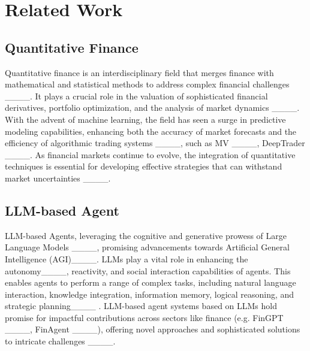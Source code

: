 \section{Related Work}
\subsection{Quantitative Finance}
Quantitative finance is an interdisciplinary field that merges finance with mathematical and statistical methods to address complex financial challenges ____. It plays a crucial role in the valuation of sophisticated financial derivatives, portfolio optimization, and the analysis of market dynamics ____. With the advent of machine learning, the field has seen a surge in predictive modeling capabilities, enhancing both the accuracy of market forecasts and the efficiency of algorithmic trading systems ____, such as MV ____, DeepTrader ____. As financial markets continue to evolve, the integration of quantitative techniques is essential for developing effective strategies that can withstand market uncertainties ____.

\subsection{LLM-based Agent}
LLM-based Agents, leveraging the cognitive and generative prowess of Large Language Models ____, promising advancements towards Artificial General Intelligence (AGI)____. LLMs play a vital role in enhancing the autonomy____, reactivity, and social interaction capabilities of agents. This enables agents to perform a range of complex tasks, including natural language interaction, knowledge integration, information memory, logical reasoning, and strategic planning____ . LLM-based agent systems based on LLMs hold promise for impactful contributions across sectors like finance (e.g. FinGPT ____, FinAgent ____), offering novel approaches and sophisticated solutions to intricate challenges ____.